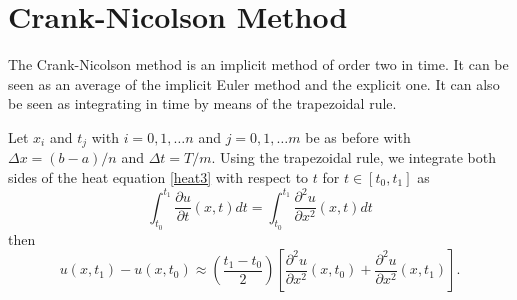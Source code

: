 \documentclass[00main.tex]{subfiles}
\begin{document}
\section{Crank-Nicolson Method}




The Crank-Nicolson method is an implicit method of order two in time. It can be seen as an average of the implicit Euler method and the explicit one. It can also be seen as integrating in time by means of the trapezoidal rule. 

Let $x_i$ and $t_j$ with $i=0,1,\hdots n$ and $j=0,1,\hdots m$ be as before with $\Delta x = (b-a)/n$ and $\Delta t = T/m$. Using the trapezoidal rule, we integrate both sides of the heat equation \eqref{heat3} with respect to $t$ for $t\in [t_0, t_1]$ as \[
\int_{t_0}^{t_1} \frac{\partial u}{\partial t} (x,t) dt = \int_{t_0}^{t_1} \frac{\partial^2 u}{\partial x^2} (x,t) dt\] then
\[ u (x, t_1) - u(x, t_0) \approx \left( \frac{t_1 -t_0}{2} \right) \left[ \frac{\partial ^2 u}{\partial x^2} (x, t_0) + \frac{\partial ^2 u}{\partial x^2} (x, t_1) \right]. \]
\end{document}
